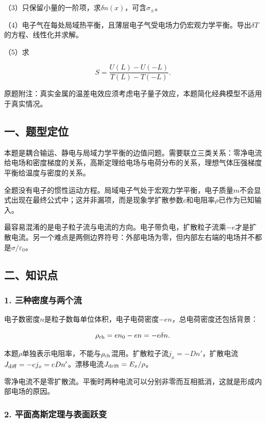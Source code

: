 \documentclass[12pt,a4paper,fontset=fandol]{ctexart}
\begin{document}
（3）只保留小量的一阶项，求\(\delta n(x)\)，可含\(\sigma_\pm\)。

（4）电子气在每处局域热平衡，且薄层电子气受电场力仍宏观力学平衡。导出\(\delta T\)的方程、线性化并求解。

（5）求

\[
S=\frac{U(L)-U(-L)}{T(L)-T(-L)}.
\]

原题附注：真实金属的温差电效应须考虑电子量子效应，本题简化经典模型不适用于真实情况。

\subsection{一、题型定位}\label{ux4e00ux9898ux578bux5b9aux4f4d-5}

本题是耦合输运、静电与局域力学平衡的边值问题。需要联立三类关系：零净电流给电场和密度梯度的关系，高斯定理给电场与电荷分布的关系，理想气体压强梯度平衡给温度与密度的关系。

全题没有电子的惯性运动方程。局域电子气处于宏观力学平衡，电子质量\(m\)不会显式出现在最终公式中；这并非漏项，而是现象学扩散参数\(c\)和电阻率\(\rho\)已作为已知输入。

最容易混淆的是电子粒子流与电流的方向。电子带负电，扩散粒子流乘\(-e\)才是扩散电流。另一个难点是两侧边界符号：外部电场为零，但内部左右端的电场并不都是\(\sigma/\varepsilon_0\)。

\subsection{二、知识点}\label{ux4e8cux77e5ux8bc6ux70b9-5}

\subsubsection{1.
三种密度与两个流}\label{ux4e09ux79cdux5bc6ux5ea6ux4e0eux4e24ux4e2aux6d41}

电子数密度\(n\)是粒子数每单位体积，电子电荷密度\(-en\)，总电荷密度还包括背景：

\[
\rho_{\rm ch}=en_0-en=-e\delta n.
\]

本题\(\rho\)单独表示电阻率，不能与\(\rho_{\rm ch}\)混用。扩散粒子流\(j_x=-Dn'\)，扩散电流\(J_{\rm diff}=-ej_x=eDn'\)。漂移电流\(J_{\rm drift}=E_x/\rho\)。

零净电流不是零扩散流。平衡时两种电流可以分别非零而互相抵消，这就是形成内部电场的原因。

\subsubsection{2.
平面高斯定理与表面跃变}\label{ux5e73ux9762ux9ad8ux65afux5b9aux7406ux4e0eux8868ux9762ux8dc3ux53d8}
\end{document}
